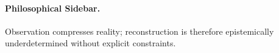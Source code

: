 \paragraph{Philosophical Sidebar.} Observation compresses reality; reconstruction is therefore epistemically underdetermined without explicit constraints.\n